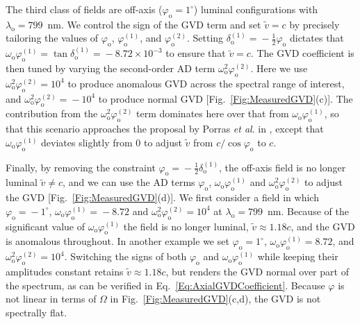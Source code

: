 \documentclass[reprint,
 amsmath,amssymb,
 aps,
]{revtex4-2}
\begin{document}
The third class of fields are off-axis ($\varphi_{\mathrm{o}}\!=\!1^{\circ}$) luminal configurations with $\lambda_{\mathrm{o}}\!=\!799$~nm. We control the sign of the GVD term and set $\widetilde{v}\!=\!c$ by precisely tailoring the values of $\varphi_{\mathrm{o}}$, $\varphi_{\mathrm{o}}^{(1)}$, and $\varphi_{\mathrm{o}}^{(2)}$. Setting $\delta_{\mathrm{o}}^{(1)}\!=\!-\tfrac{1}{2}\varphi_{\mathrm{o}}$ dictates that $\omega_{\mathrm{o}}\varphi_{\mathrm{o}}^{(1)}\!=\!\tan{\delta_{\mathrm{o}}^{(1)}}\!=\!-8.72\!\times\!10^{-3}$ to ensure that $\widetilde{v}\!=\!c$. The GVD coefficient is then tuned by varying the second-order AD term $\omega_{\mathrm{o}}^{2}\varphi_{\mathrm{o}}^{(2)}$. Here we use $\omega_{\mathrm{o}}^{2}\varphi_{\mathrm{o}}^{(2)}\!=\!10^{4}$ to produce anomalous GVD across the spectral range of interest, and $\omega_{\mathrm{o}}^{2}\varphi_{\mathrm{o}}^{(2)}\!=\!-10^{4}$ to produce normal GVD [Fig.~\ref{Fig:MeasuredGVD}(c)]. The contribution from the $\omega_{\mathrm{o}}^{2}\varphi_{\mathrm{o}}^{(2)}$ term dominates here over that from $\omega_{\mathrm{o}}\varphi_{\mathrm{o}}^{(1)}$, so that this scenario approaches the proposal by Porras \textit{et al}. in \cite{Porras03PRE2}, except that $\omega_{\mathrm{o}}\varphi_{\mathrm{o}}^{(1)}$ deviates slightly from 0 to adjust $\widetilde{v}$ from $c/\cos{\varphi_{\mathrm{o}}}$ to $c$.

Finally, by removing the constraint $\varphi_{\mathrm{o}}\!=\!-\tfrac{1}{2}\delta_{\mathrm{o}}^{(1)}$, the off-axis field is no longer luminal $\widetilde{v}\!\neq\!c$, and we can use the AD terms $\varphi_{\mathrm{o}}$, $\omega_{\mathrm{o}}\varphi_{\mathrm{o}}^{(1)}$ and $\omega_{\mathrm{o}}^{2}\varphi_{\mathrm{o}}^{(2)}$ to adjust the GVD [Fig.~\ref{Fig:MeasuredGVD}(d)]. We first consider a field in which $\varphi_{\mathrm{o}}\!=\!-1^{\circ}$, $\omega_{\mathrm{o}}\varphi_{\mathrm{o}}^{(1)}\!=\!-8.72$ and $\omega_{\mathrm{o}}^{2}\varphi_{\mathrm{o}}^{(2)}\!=\!10^{4}$ at $\lambda_{\mathrm{o}}\!=\!799$~nm. Because of the significant value of $\omega_{\mathrm{o}}\varphi_{\mathrm{o}}^{(1)}$ the field is no longer luminal, $\widetilde{v}\!\approx\!1.18c$, and the GVD is anomalous throughout. In another example we set $\varphi_{\mathrm{o}}\!=\!1^{\circ}$, $\omega_{\mathrm{o}}\varphi_{\mathrm{o}}^{(1)}\!=\!8.72$, and $\omega_{\mathrm{o}}^{2}\varphi_{\mathrm{o}}^{(2)}\!=\!10^{4}$. Switching the signs of both $\varphi_{\mathrm{o}}$ and $\omega_{\mathrm{o}}\varphi_{\mathrm{o}}^{(1)}$ while keeping their amplitudes constant retains $\widetilde{v}\!\approx\!1.18c$, but renders the GVD normal over part of the spectrum, as can be verified in Eq.~\ref{Eq:AxialGVDCoefficient}. Because $\varphi$ is not linear in terms of $\Omega$ in Fig.~\ref{Fig:MeasuredGVD}(c,d), the GVD is not spectrally flat.
\end{document}
